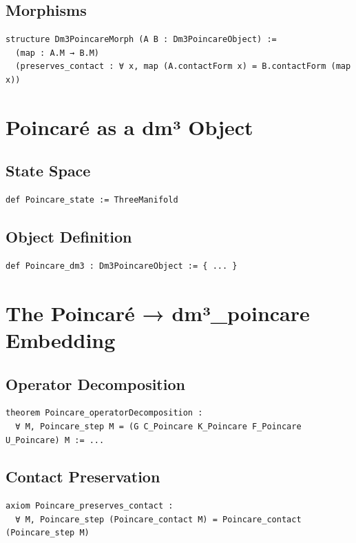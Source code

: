 \documentclass[11pt,a4paper]{article}
\begin{document}
\subsection{Morphisms}
\begin{lstlisting}
structure Dm3PoincareMorph (A B : Dm3PoincareObject) :=
  (map : A.M → B.M)
  (preserves_contact : ∀ x, map (A.contactForm x) = B.contactForm (map x))
\end{lstlisting}

\section{Poincaré as a dm³ Object}

\subsection{State Space}
\begin{lstlisting}
def Poincare_state := ThreeManifold
\end{lstlisting}

\subsection{Object Definition}
\begin{lstlisting}
def Poincare_dm3 : Dm3PoincareObject := { ... }
\end{lstlisting}

\section{The Poincaré → dm³\_poincare Embedding}

\subsection{Operator Decomposition}
\begin{lstlisting}
theorem Poincare_operatorDecomposition :
  ∀ M, Poincare_step M = (G C_Poincare K_Poincare F_Poincare U_Poincare) M := ...
\end{lstlisting}

\subsection{Contact Preservation}
\begin{lstlisting}
axiom Poincare_preserves_contact :
  ∀ M, Poincare_step (Poincare_contact M) = Poincare_contact (Poincare_step M)
\end{lstlisting}
\end{document}
